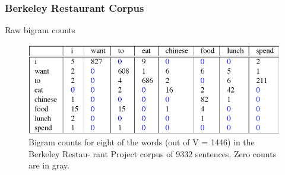\documentclass[13.5pt,aspecratio=169]{beamer}
\begin{document}
\begin{frame}
    \onehalfspacing
        \frametitle{Berkeley Restaurant Corpus}
        \begin{minipage}{0.3\textwidth}
            \begin{block}{}
                Raw bigram counts
            \end{block}
        \end{minipage}
        
        \bigskip
            \begin{figure}
                \centering
                \includegraphics [scale=0.6] {raw_bigram_counts.png}
                \caption{Bigram counts for eight of the words (out of V = 1446) in the Berkeley Restau-
                rant Project corpus of 9332 sentences. Zero counts are in gray.}
            \end{figure}
        
\end{frame}






\end{document}

